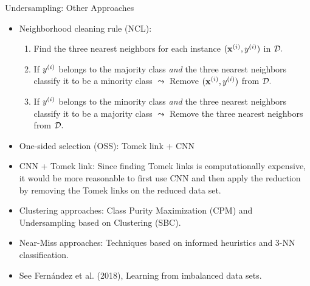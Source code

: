 \documentclass[11pt,compress,t,notes=noshow, xcolor=table]{beamer}
\begin{document}
	\begin{frame}{Undersampling: Other Approaches}
		\footnotesize
		\begin{itemize}
%			
			\item Neighborhood cleaning rule (NCL):
%			
			\begin{enumerate} \footnotesize
%				
				\item Find the three nearest neighbors for each instance $(\mathbf{x}^{(i)},y^{(i)})$ in $\mathcal{D}.$
%				
				\item If $y^{(i)}$ belongs to the majority class \emph{and} the three nearest neighbors classify it to be a minority class $\leadsto$ Remove $(\mathbf{x}^{(i)},y^{(i)})$ from $\mathcal{D}.$
%				
				\item If $y^{(i)}$ belongs to the minority class \emph{and} the three nearest neighbors classify it to be a majority class $\leadsto$ Remove the three nearest neighbors from $\mathcal{D}.$
%				
			\end{enumerate} 
%			
			\item One-sided selection (OSS): Tomek link + CNN
%			
			\item CNN + Tomek link: Since finding Tomek links is computationally expensive, it would be more reasonable to first use CNN and then apply the reduction by removing the Tomek links on the reduced data set.
%			
			\item Clustering approaches: Class Purity Maximization (CPM) and Undersampling based on Clustering (SBC).
%			
			\item Near-Miss approaches: Techniques based on informed heuristics and 3-NN classification.
%			
			\item See Fern\'andez et al. (2018), Learning from imbalanced data sets.
%
		\end{itemize}
	\end{frame}
	
\end{document}
